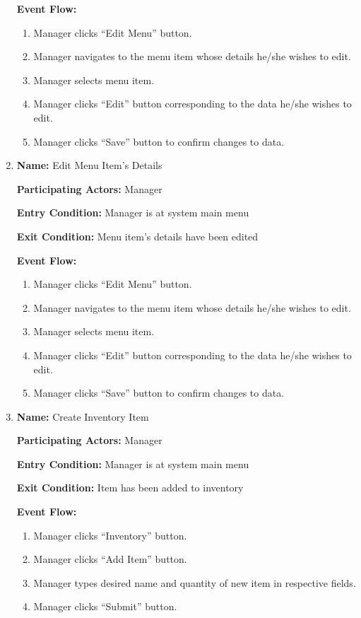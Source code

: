 \documentclass[11pt]{article}
\begin{document}
\begin{enumerate}
			\textbf{Event Flow:}
			\begin{enumerate}
				\setlength{\leftskip}{1cm}
				\item Manager clicks ``Edit Menu'' button.
				\item Manager navigates to the menu item whose details he/she wishes to edit.
				\item Manager selects menu item.
				\item Manager clicks ``Edit'' button corresponding to the data he/she wishes to edit.
				\item Manager clicks ``Save'' button to confirm changes to data.\\
			\end{enumerate}

		\item \textbf{Name:} 				Edit Menu Item's Details

			\textbf{Participating Actors:} 	Manager

			\textbf{Entry Condition:} 		Manager is at system main menu

			\textbf{Exit Condition:} 		Menu item's details have been edited

			\textbf{Event Flow:}
			\begin{enumerate}
				\setlength{\leftskip}{1cm}
				\item Manager clicks ``Edit Menu'' button.
				\item Manager navigates to the menu item whose details he/she wishes to edit.
				\item Manager selects menu item.
				\item Manager clicks ``Edit'' button corresponding to the data he/she wishes to edit.
				\item Manager clicks ``Save'' button to confirm changes to data.\\
			\end{enumerate}

		\item \textbf{Name:} 				Create Inventory Item

			\textbf{Participating Actors:} 	Manager

			\textbf{Entry Condition:} 		Manager is at system main menu

			\textbf{Exit Condition:} 		Item has been added to inventory

			\textbf{Event Flow:}
			\begin{enumerate}
				\setlength{\leftskip}{1cm}
				\item Manager clicks ``Inventory'' button.
				\item Manager clicks ``Add Item'' button.
				\item Manager types desired name and quantity of new item in respective fields.
				\item Manager clicks ``Submit'' button.\\
			\end{enumerate}


\end{enumerate}
\end{document}
